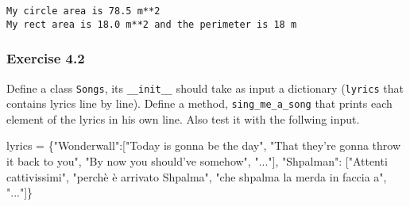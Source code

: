 \documentclass[11pt]{article}
\newenvironment{Shaded}{}{}
\newcommand{\StringTok}[1]{\textcolor[rgb]{0.25,0.44,0.63}{{#1}}}
\newcommand{\NormalTok}[1]{{#1}}
\newcommand{\OperatorTok}[1]{\textcolor[rgb]{0.40,0.40,0.40}{{#1}}}
\begin{document}
    \begin{Verbatim}[commandchars=\\\{\}]
My circle area is 78.5 m**2
My rect area is 18.0 m**2 and the perimeter is 18 m

    \end{Verbatim}

    \hypertarget{exercise-4.2}{%
\subsubsection{Exercise 4.2}\label{exercise-4.2}}

Define a class \texttt{Songs}, its \texttt{\_\_init\_\_} should take as
input a dictionary (\texttt{lyrics} that contains lyrics line by line).
Define a method, \texttt{sing\_me\_a\_song} that prints each element of
the lyrics in his own line. Also test it with the follwing input.

\begin{Shaded}
\begin{Highlighting}[]
\NormalTok{lyrics }\OperatorTok{=}\NormalTok{ \{}\StringTok{"Wonderwall"}\NormalTok{:[}\StringTok{"Today is gonna be the day"}\NormalTok{,}
                        \StringTok{"That they're gonna throw it back to you"}\NormalTok{,}
                        \StringTok{"By now you should've somehow"}\NormalTok{, }\StringTok{"..."}\NormalTok{], }
          \StringTok{"Shpalman"}\NormalTok{:  [}\StringTok{"Attenti cattivissimi"}\NormalTok{,}
                        \StringTok{"perchè è arrivato Shpalma"}\NormalTok{,}
                        \StringTok{"che shpalma la merda in faccia a"}\NormalTok{, }\StringTok{"..."}\NormalTok{]\}}
\end{Highlighting}
\end{Shaded}
\end{document}
